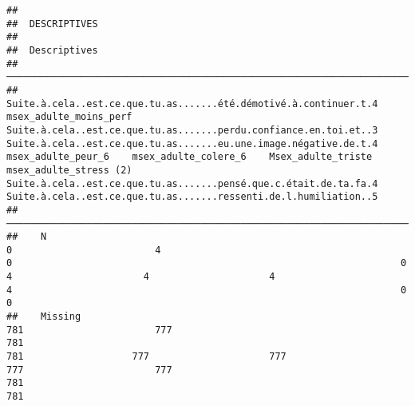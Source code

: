 \documentclass[
]{article}
\begin{document}
\begin{verbatim}
## 
##  DESCRIPTIVES
## 
##  Descriptives                                                                                                                                                                                                                                                                                                                                                                                                                                                                                 
##  ──────────────────────────────────────────────────────────────────────────────────────────────────────────────────────────────────────────────────────────────────────────────────────────────────────────────────────────────────────────────────────────────────────────────────────────────────────────────────────────────────────────────────────────────────────────────────────────────────────────────────────────────────────────────────────────────────────────────────────────── 
##               Suite.à.cela..est.ce.que.tu.as.......été.démotivé.à.continuer.t.4    msex_adulte_moins_perf    Suite.à.cela..est.ce.que.tu.as.......perdu.confiance.en.toi.et..3    Suite.à.cela..est.ce.que.tu.as.......eu.une.image.négative.de.t.4    msex_adulte_peur_6    msex_adulte_colere_6    Msex_adulte_triste    msex_adulte_stress (2)    Suite.à.cela..est.ce.que.tu.as.......pensé.que.c.était.de.ta.fa.4    Suite.à.cela..est.ce.que.tu.as.......ressenti.de.l.humiliation..5   
##  ──────────────────────────────────────────────────────────────────────────────────────────────────────────────────────────────────────────────────────────────────────────────────────────────────────────────────────────────────────────────────────────────────────────────────────────────────────────────────────────────────────────────────────────────────────────────────────────────────────────────────────────────────────────────────────────────────────────────────────────── 
##    N                                                                          0                         4                                                                    0                                                                    0                     4                       4                     4                         4                                                                    0                                                                    0   
##    Missing                                                                  781                       777                                                                  781                                                                  781                   777                     777                   777                       777                                                                  781                                                                  781   

\end{verbatim}
\end{document}
